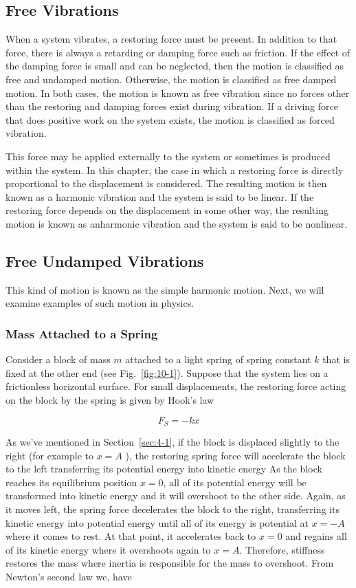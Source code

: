 \documentclass[10pt]{article}
\numberwithin{equation}{section}
\begin{document}
\subsection{Free Vibrations}\label{sec:10-2}
When a system vibrates, a restoring force must be present. In addition to that force, there is always a retarding or damping force such as friction. If the effect of the damping force is small and can be neglected, then the motion is classified as free and undamped motion. Otherwise, the motion is classified as free damped motion. In both cases, the motion is known as free vibration since no forces other than the restoring and damping forces exist during vibration. If a driving force that does positive work on the system exists, the motion is classified as forced vibration.

This force may be applied externally to the system or sometimes is produced within the system. In this chapter, the case in which a restoring force is directly proportional to the displacement is considered. The resulting motion is then known as a harmonic vibration and the system is said to be linear. If the restoring force depends on the displacement in some other way, the resulting motion is known as anharmonic vibration and the system is said to be nonlinear.

\subsection{Free Undamped Vibrations}\label{sec:10-3}
This kind of motion is known as the simple harmonic motion. Next, we will examine examples of such motion in physics.

\subsubsection{Mass Attached to a Spring}\label{sec:10-3-1}
Consider a block of mass $m$ attached to a light spring of spring constant $k$ that is fixed at the other end (see Fig.~\ref{fig:10-1}). Suppose that the system lies on a frictionless horizontal surface. For small displacements, the restoring force acting on the block by the spring is given by Hook's law

$$
F_{S}=-k x
$$

As we've mentioned in Section~\ref{sec:4-1}, if the block is displaced slightly to the right (for example to $x=A$ ), the restoring spring force will accelerate the block to the left transferring its potential energy into kinetic energy As the block reaches its equilibrium position $x=0$, all of its potential energy will be transformed into kinetic energy and it will overshoot to the other side. Again, as it moves left, the spring force decelerates the block to the right, transferring its kinetic energy into potential energy until all of its energy is potential at $x=-A$ where it comes to rest. At that point, it accelerates back to $x=0$ and regains all of its kinetic energy where it overshoots again to $x=A$. Therefore, stiffness restores the mass where inertia is responsible for the mass to overshoot. From Newton's second law we, have
\end{document}
